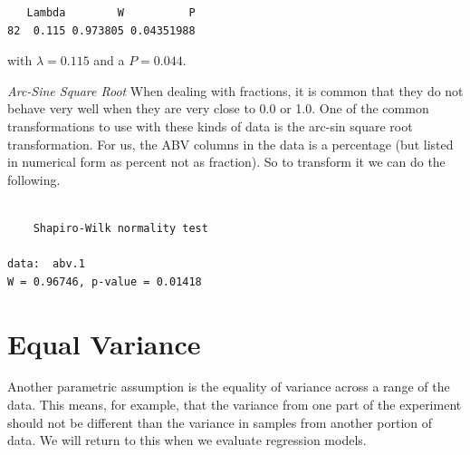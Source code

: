 \documentclass[
  letterpaper,
]{book}
\newenvironment{Shaded}{\begin{snugshade}}{\end{snugshade}}
\newcommand{\FloatTok}[1]{\textcolor[rgb]{0.68,0.00,0.00}{#1}}
\newcommand{\FunctionTok}[1]{\textcolor[rgb]{0.28,0.35,0.67}{#1}}
\newcommand{\NormalTok}[1]{\textcolor[rgb]{0.00,0.23,0.31}{#1}}
\newcommand{\OtherTok}[1]{\textcolor[rgb]{0.00,0.23,0.31}{#1}}
\newcommand{\SpecialCharTok}[1]{\textcolor[rgb]{0.37,0.37,0.37}{#1}}
\begin{document}
\begin{Shaded}
\end{Shaded}

\begin{verbatim}
   Lambda        W          P
82  0.115 0.973805 0.04351988
\end{verbatim}

with \(\lambda = 0.115\) and a \(P = 0.044\).

\emph{Arc-Sine Square Root} When dealing with fractions, it is common
that they do not behave very well when they are very close to 0.0 or
1.0. One of the common transformations to use with these kinds of data
is the arc-sin square root transformation. For us, the ABV columns in
the data is a percentage (but listed in numerical form as percent not as
fraction). So to transform it we can do the following.

\begin{Shaded}
\end{Shaded}

\begin{verbatim}

    Shapiro-Wilk normality test

data:  abv.1
W = 0.96746, p-value = 0.01418
\end{verbatim}

\section{Equal Variance}\label{equal-variance}

Another parametric assumption is the equality of variance across a range
of the data. This means, for example, that the variance from one part of
the experiment should not be different than the variance in samples from
another portion of data. We will return to this when we evaluate
regression models.
\end{document}
